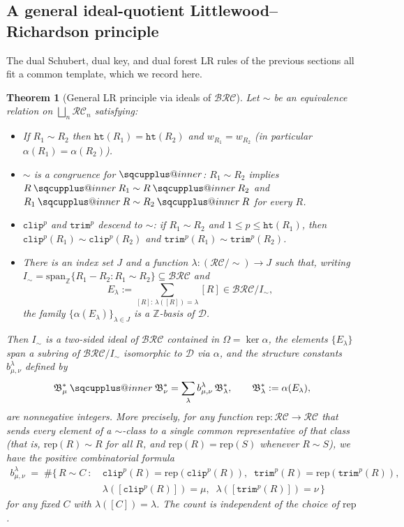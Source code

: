 \documentclass[a4paper,fleqn]{cas-sc}
\makeatletter
\newcommand{\sqcupplus@inner}[2]{%
  \vcenter{\hbox{\ooalign{%
    \hfil$\m@th#1\sqcup$\hfil\cr
    \hfil\raisebox{0.15ex}{$\m@th#1\scriptscriptstyle+$}\hfil\cr
  }}}%
}
\newcommand{\sqcupplus}{\mathbin{\mathpalette\sqcupplus@inner\relax}}
\newtheorem{theorem}{Theorem}[section]
\theoremstyle{definition}
\theoremstyle{remark}
\numberwithin{equation}{subsection}
\newcommand{\wof}[1]{w_{#1}}
\newcommand{\trm}{\mathtt{trim}}
\newcommand{\hr}{\mathtt{ht}}
\newcommand{\clp}{\mathtt{clip}}
\newcommand{\BRC}{\mathcal{BRC}}
\newcommand{\RC}{\mathcal{RC}}
\newcommand{\dcoma}{\mathcal{D}}
\makeatother
\begin{document}
\subsection{A general ideal-quotient Littlewood--Richardson principle}

The dual Schubert, dual key, and dual forest LR rules of the previous sections all fit a common template, which we record here.

\begin{theorem}[General LR principle via ideals of $\BRC$]\label{theorem:general_lr_template}
Let $\sim$ be an equivalence relation on $\bigsqcup_n \RC_n$ satisfying:
\begin{itemize}
\item[(H1)] If $R_1\sim R_2$ then $\hr(R_1)=\hr(R_2)$ and $\wof{R_1}=\wof{R_2}$ (in particular $\alpha(R_1)=\alpha(R_2)$).
\item[(H2)] $\sim$ is a congruence for $\sqcupplus$: $R_1\sim R_2$ implies $R\sqcupplus R_1\sim R\sqcupplus R_2$ and $R_1\sqcupplus R\sim R_2\sqcupplus R$ for every $R$.
\item[(H3)] $\clp^p$ and $\trm^p$ descend to $\sim$: if $R_1\sim R_2$ and $1\leq p\leq \hr(R_1)$, then $\clp^p(R_1)\sim \clp^p(R_2)$ and $\trm^p(R_1)\sim \trm^p(R_2)$.
\item[(H4)] There is an index set $J$ and a function $\lambda:(\RC/\!\sim)\to J$ such that, writing $I_\sim=\mathrm{span}_{\mathbb{Z}}\{R_1-R_2:R_1\sim R_2\}\subseteq\BRC$ and
$$E_\lambda := \sum_{[R]:\,\lambda([R])=\lambda} [R] \in \BRC/I_\sim,$$
the family $\{\alpha(E_\lambda)\}_{\lambda\in J}$ is a $\mathbb{Z}$-basis of $\dcoma$.

\end{itemize}
Then $I_\sim$ is a two-sided ideal of $\BRC$ contained in $\Omega=\ker\alpha$, the elements $\{E_\lambda\}$ span a subring of $\BRC/I_\sim$ isomorphic to $\dcoma$ via $\alpha$, and the structure constants $b_{\mu,\nu}^\lambda$ defined by
$$\mathfrak{B}_\mu^*\sqcupplus\mathfrak{B}_\nu^* = \sum_\lambda b_{\mu,\nu}^\lambda\,\mathfrak{B}_\lambda^*,\qquad \mathfrak{B}_\lambda^*:=\alpha(E_\lambda),$$
are nonnegative integers. More precisely, for any function $\mathrm{rep}\colon\RC\to\RC$ that sends every element of a $\sim$-class to a single common representative of that class (that is, $\mathrm{rep}(R)\sim R$ for all $R$, and $\mathrm{rep}(R)=\mathrm{rep}(S)$ whenever $R\sim S$), we have the positive combinatorial formula
\begin{align*}
b_{\mu,\nu}^\lambda \;=\; \#\bigl\{\,R\sim C\ :\ &\clp^p(R)=\mathrm{rep}(\clp^p(R)),\;\;\trm^p(R)=\mathrm{rep}(\trm^p(R)),\\
&\lambda([\clp^p(R)])=\mu,\;\;\lambda([\trm^p(R)])=\nu\,\bigr\}
\end{align*}
for any fixed $C$ with $\lambda([C])=\lambda$. The count is independent of the choice of $\mathrm{rep}$.
\end{theorem}
\end{document}
